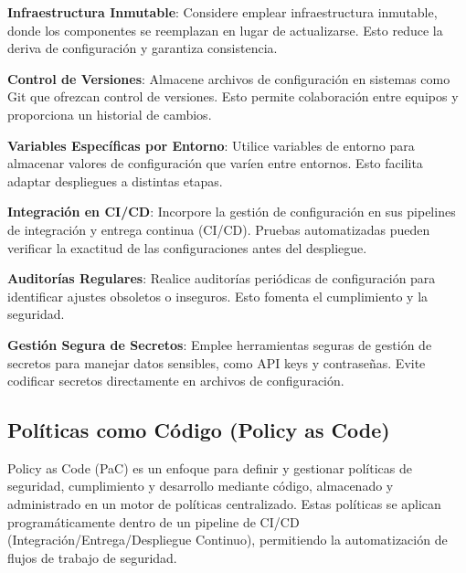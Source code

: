 \documentclass[12pt]{book}
\begin{document}
\textbf{Infraestructura Inmutable}: Considere emplear infraestructura inmutable, donde los componentes se reemplazan en lugar de actualizarse. Esto reduce la deriva de configuración y garantiza consistencia.

\textbf{Control de Versiones}: Almacene archivos de configuración en sistemas como Git que ofrezcan control de versiones. Esto permite colaboración entre equipos y proporciona un historial de cambios.

\textbf{Variables Específicas por Entorno}: Utilice variables de entorno para almacenar valores de configuración que varíen entre entornos. Esto facilita adaptar despliegues a distintas etapas.

\textbf{Integración en CI/CD}: Incorpore la gestión de configuración en sus pipelines de integración y entrega continua (CI/CD). Pruebas automatizadas pueden verificar la exactitud de las configuraciones antes del despliegue.

\textbf{Auditorías Regulares}: Realice auditorías periódicas de configuración para identificar ajustes obsoletos o inseguros. Esto fomenta el cumplimiento y la seguridad.

\textbf{Gestión Segura de Secretos}: Emplee herramientas seguras de gestión de secretos para manejar datos sensibles, como API keys y contraseñas. Evite codificar secretos directamente en archivos de configuración.
\subsection{Políticas como Código (Policy as Code)}
Policy as Code (PaC) es un enfoque para definir y gestionar políticas de seguridad, cumplimiento y desarrollo mediante código, almacenado y administrado en un motor de políticas centralizado. Estas políticas se aplican programáticamente dentro de un pipeline de CI/CD (Integración/Entrega/Despliegue Continuo), permitiendo la automatización de flujos de trabajo de seguridad.
\end{document}
